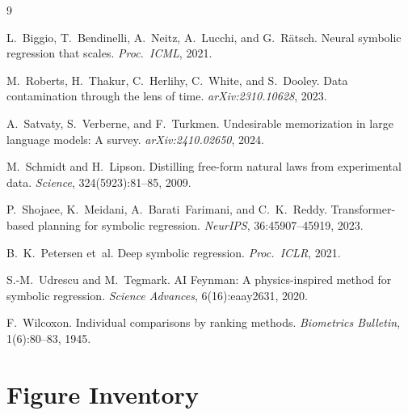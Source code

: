 \documentclass[twoside,11pt]{article}
\begin{document}
\begin{thebibliography}{9}

L.~Biggio, T.~Bendinelli, A.~Neitz, A.~Lucchi, and G.~Rätsch.
\newblock Neural symbolic regression that scales.
\newblock \textit{Proc.\ ICML}, 2021.

M.~Roberts, H.~Thakur, C.~Herlihy, C.~White, and S.~Dooley.
\newblock Data contamination through the lens of time.
\newblock \textit{arXiv:2310.10628}, 2023.

A.~Satvaty, S.~Verberne, and F.~Turkmen.
\newblock Undesirable memorization in large language models: A survey.
\newblock \textit{arXiv:2410.02650}, 2024.

M.~Schmidt and H.~Lipson.
\newblock Distilling free-form natural laws from experimental data.
\newblock \textit{Science}, 324(5923):81--85, 2009.

P.~Shojaee, K.~Meidani, A.~Barati~Farimani, and C.~K.~Reddy.
\newblock Transformer-based planning for symbolic regression.
\newblock \textit{NeurIPS}, 36:45907--45919, 2023.

B.~K.~Petersen et~al.
\newblock Deep symbolic regression.
\newblock \textit{Proc.\ ICLR}, 2021.

S.-M.~Udrescu and M.~Tegmark.
\newblock AI Feynman: A physics-inspired method for symbolic regression.
\newblock \textit{Science Advances}, 6(16):eaay2631, 2020.

F.~Wilcoxon.
\newblock Individual comparisons by ranking methods.
\newblock \textit{Biometrics Bulletin}, 1(6):80--83, 1945.

\end{thebibliography}

\appendix

\section{Figure Inventory}
\label{app:figures}
\end{document}
